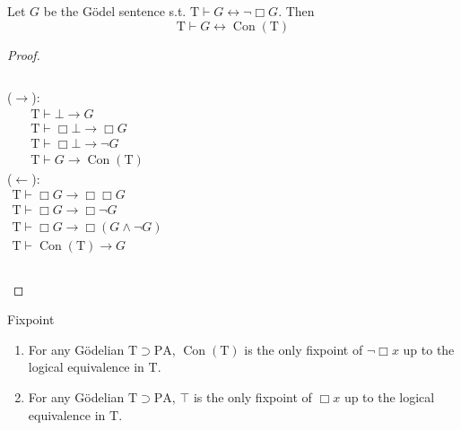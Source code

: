 \documentclass[UTF8,aspectratio=43,11pt,colorlinks,compress,openany]{beamer}%
\begin{document}
\begin{frame}\frametitle{}
\setlength\abovedisplayskip{0pt}
\setlength\belowdisplayskip{0pt}
	\begin{block}{}
		Let $G$ be the G\"odel sentence s.t. $\mathrm{T}\vdash G\leftrightarrow\neg\Box G$. Then
		\[\mathrm{T}\vdash G\leftrightarrow\operatorname{Con}(\mathrm{T})\]
	\end{block}
	\begin{proof}
		\begin{columns}
			($\to$): 
			\begin{gather*}
				\mathrm{T}\vdash\bot\to G\\
				\mathrm{T}\vdash\Box \bot\to\Box G\\
				\mathrm{T}\vdash\Box \bot\to\neg G\\
				\mathrm{T}\vdash G\to\operatorname{Con}(\mathrm{T})
			\end{gather*}
			($\leftarrow$): 
			\begin{gather*}
				\mathrm{T}\vdash\Box G\to\Box \Box G\\
				\mathrm{T}\vdash\Box G\to\Box \neg G\\
				\mathrm{T}\vdash\Box G\to\Box (G\wedge\neg G)\\
				\mathrm{T}\vdash\operatorname{Con}(\mathrm{T})\to G
			\end{gather*}
		\end{columns}
	\end{proof}
	\begin{block}{Fixpoint}
		\begin{enumerate}
			\item For any G\"odelian $\mathrm{T}\supset \mathrm{PA} $, $\operatorname{Con}(\mathrm{T})$ is the only fixpoint of $\neg\Box x$ up to the logical equivalence in $\mathrm{T}$.
			\item For any G\"odelian $\mathrm{T}\supset\mathrm{PA} $, $\top$ is the only fixpoint of $\Box x$ up to the logical equivalence in $\mathrm{T}$.
		\end{enumerate}
	\end{block}
\end{frame}
\end{document}
